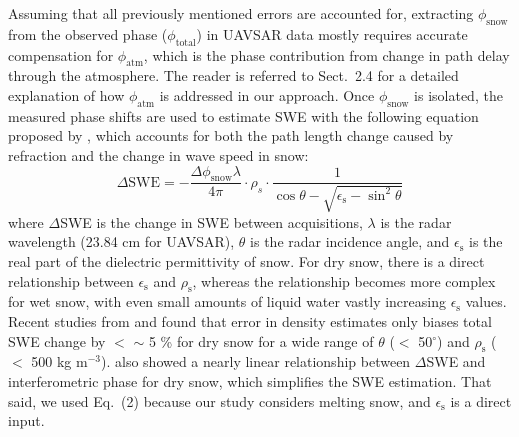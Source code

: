 Assuming that all previously mentioned errors are accounted for, extracting $\phi_\mathrm{snow}$ from the observed phase ($\phi_\mathrm{total}$) in UAVSAR data mostly requires accurate compensation for $\phi_\mathrm{atm}$, which is the phase contribution from change in path delay through the atmosphere. The reader is referred to Sect.~2.4 for a detailed explanation of how $\phi_{\mathrm{atm}}$ is addressed in our approach. Once $\phi_\mathrm{snow}$ is isolated, the measured phase shifts are used to estimate SWE with the following equation proposed by \citet{guneriussenInSAREstimationChanges2001}, which accounts for both the path length change caused by refraction and the change in wave speed in snow:
\begin{equation}
\Delta\text{SWE} = - \frac{\Delta \phi_\mathrm{snow} \lambda}{4 \pi} \cdot \rho_{s} \cdot \frac{1}{\cos \theta- \sqrt{\epsilon_\mathrm{s} - \sin^{2} \theta}}
\label{eq:insar_dswe}
\end{equation}
where $\Delta$SWE is the change in SWE between acquisitions, $\lambda$ is the radar wavelength (23.84 cm for UAVSAR), $\theta$ is the radar incidence angle, and $\epsilon_\mathrm{s}$ is the real part of the dielectric permittivity of snow. For dry snow, there is a direct relationship between $\epsilon_\mathrm{s}$ and $\rho_\mathrm{s}$, whereas the relationship becomes more complex for wet snow, with even small amounts of liquid water vastly increasing $\epsilon_\mathrm{s}$ values. Recent studies from \citet{epplerSnowWaterEquivalent2022} and \citet{leinssSnowWaterEquivalent2015} found that error in density estimates only biases total SWE change by $<$ $\sim$ 5 \% for dry snow for a wide range of $\theta$ ($<$ 50$^{\circ}$) and $\rho_\mathrm{s}$ ($<$ 500 kg m$^{-3}$). \citet{leinssSnowWaterEquivalent2015} also showed a nearly linear relationship between $\Delta$SWE and interferometric phase for dry snow, which simplifies the SWE estimation. That said, we used Eq.~(2) because our study considers melting snow, and $\epsilon_\mathrm{s}$ is a direct input. \par

